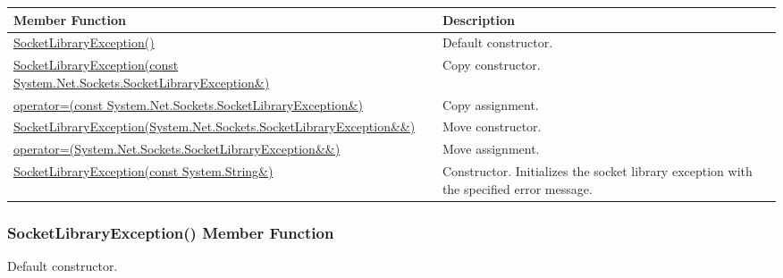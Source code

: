 \documentclass[a4paper,oneside,11.000000pt]{book}
\begin{document}
\begin{flushleft}
\begin{supertabular}[l]{!{\raggedright}p{7.575cm}!{\raggedright}p{7.575cm}}
\textbf{Member Function}
& \textbf{Description}
\\
\hline
\hyperlink{System.Net.Sockets.SocketLibraryException.constructor.P.System.Net.Sockets.SocketLibraryException}{SocketLibraryException()}
& Default constructor.

\\
\hyperlink{System.Net.Sockets.SocketLibraryException.constructor.P.System.Net.Sockets.SocketLibraryException.C.R.System.Net.Sockets.SocketLibraryException}{SocketLibraryException(const System.\-Net.\-Sockets.\-SocketLibraryException\&\-)}
& Copy constructor.

\\
\hyperlink{System.Net.Sockets.SocketLibraryException.operator.assign.P.System.Net.Sockets.SocketLibraryException.C.R.System.Net.Sockets.SocketLibraryException}{operator=(const System.\-Net.\-Sockets.\-SocketLibraryException\&\-)}
& Copy assignment.

\\
\hyperlink{System.Net.Sockets.SocketLibraryException.constructor.P.System.Net.Sockets.SocketLibraryException.RR.System.Net.Sockets.SocketLibraryException}{SocketLibraryException(System.\-Net.\-Sockets.\-SocketLibraryException\&\-\&\-)}
& Move constructor.

\\
\hyperlink{System.Net.Sockets.SocketLibraryException.operator.assign.P.System.Net.Sockets.SocketLibraryException.RR.System.Net.Sockets.SocketLibraryException}{operator=(System.\-Net.\-Sockets.\-SocketLibraryException\&\-\&\-)}
& Move assignment.

\\
\hyperlink{System.Net.Sockets.SocketLibraryException.constructor.P.System.Net.Sockets.SocketLibraryException.C.R.System.String}{SocketLibraryException(const System.\-String\&\-)}
& Constructor. Initializes the socket library exception with the specified error message.

\\
\end{supertabular}

\end{flushleft}
\clearpage

\hypertarget{System.Net.Sockets.SocketLibraryException.constructor.P.System.Net.Sockets.SocketLibraryException}{\subsubsection*{SocketLibraryException() Member Function}}\begin{flushleft}
Default constructor.

\end{flushleft}
\end{document}
